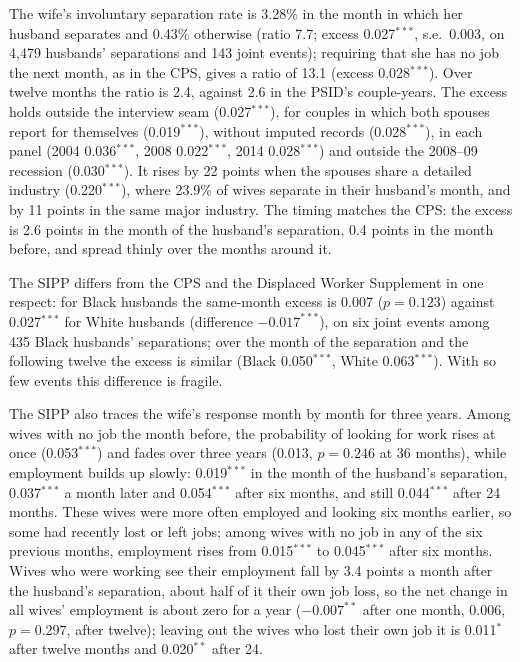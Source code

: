 The wife's involuntary separation rate is 3.28\% in the month in which her husband separates and 0.43\% otherwise
(ratio 7.7; excess 0.027$^{***}$, s.e.\ 0.003, on 4,479 husbands' separations and 143 joint events); requiring that she has
no job the next month, as in the CPS, gives a ratio of 13.1 (excess 0.028$^{***}$). Over twelve months the ratio is 2.4,
against 2.6 in the PSID's couple-years. The excess holds outside the interview seam (0.027$^{***}$), for couples in which
both spouses report for themselves (0.019$^{***}$), without imputed records (0.028$^{***}$), in each panel (2004
0.036$^{***}$, 2008 0.022$^{***}$, 2014 0.028$^{***}$) and outside the 2008--09 recession (0.030$^{***}$). It rises by 22
points when the spouses share a detailed industry (0.220$^{***}$), where 23.9\% of wives separate in their husband's
month, and by 11 points in the same major industry. The timing matches the CPS: the excess is 2.6 points in the month of
the husband's separation, 0.4 points in the month before, and spread thinly over the months around it.

The SIPP differs from the CPS and the Displaced Worker Supplement in one respect: for Black husbands the same-month
excess is 0.007 ($p=0.123$) against 0.027$^{***}$ for White husbands (difference $-0.017^{***}$), on six joint events among
435 Black husbands' separations; over the month of the separation and the following twelve the excess is similar
(Black 0.050$^{***}$, White 0.063$^{***}$). With so few events this difference is fragile.

The SIPP also traces the wife's response month by month for three years. Among wives with no job the month before, the
probability of looking for work rises at once (0.053$^{***}$) and fades over three years (0.013, $p=0.246$ at 36 months),
while employment builds up slowly: 0.019$^{***}$ in the month of the husband's separation, 0.037$^{***}$ a month later and
0.054$^{***}$ after six months, and still 0.044$^{***}$ after 24 months. These wives were more often employed and looking
six months earlier, so some had recently lost or left jobs; among wives with no job in any of the six previous months,
employment rises from 0.015$^{***}$ to 0.045$^{***}$ after six months. Wives who were working see their employment fall by
3.4 points a month after the husband's separation, about half of it their own job loss, so the net change in all wives'
employment is about zero for a year ($-0.007^{**}$ after one month, 0.006, $p=0.297$, after twelve); leaving out the wives
who lost their own job it is 0.011$^{*}$ after twelve months and 0.020$^{**}$ after 24.
